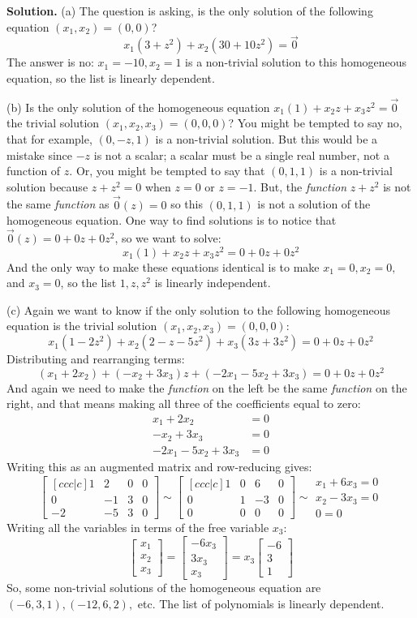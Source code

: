 \documentclass[11pt, letterpaper]{report}
\newenvironment{book}{}{}
\newcounter{example}[section]
\newcommand{\bbbvec}[3]{
  \begin{bmatrix} #1 \\ #2 \\ #3 \end{bmatrix}
}
\begin{document}
\begin{book}
\textbf{Solution.} (a) The question is asking, is the only solution of the following equation $(x_1,x_2) = (0,0)$?
\[x_1(3+z^2) + x_2(30+10z^2) = \vec{0}\]
The answer is no: $x_1=-10,x_2=1$ is a non-trivial solution to this homogeneous equation, so the list is linearly dependent.

(b) Is the only solution of the homogeneous equation $x_1(1) + x_2z + x_3z^2 = \vec{0}$ the trivial solution $(x_1,x_2,x_3) = (0,0,0)$? You might be tempted to say no, that for example, $(0,-z,1)$ is a non-trivial solution. But this would be a mistake since $-z$ is not a scalar; a scalar must be a single real number, not a function of $z$. Or, you might be tempted to say that $(0,1,1)$ is a non-trivial solution because $z+z^2=0$ when $z=0$ or $z=-1$. But, the \emph{function} $z+z^2$ is not the same \emph{function} as $\vec{0}(z)=0$ so this $(0,1,1)$ is not a solution of the homogeneous equation.
One way to find solutions is to notice that $\vec{0}(z)= 0+0z+0z^{2}$, so we want to solve:
\[x_1(1)+x_2z+x_3z^2=0+0z+0z^2\]
And the only way to make these equations identical is to make $x_1=0,x_2=0,$ and $x_3=0$, so the list $1,z,z^2$ is linearly independent.

(c) Again we want to know if the only solution to the following homogeneous equation is the trivial solution $(x_1,x_2,x_3)=(0,0,0)$:
\[x_1(1-2z^2) + x_2(2-z-5z^2) + x_3(3z+3z^2) = 0 + 0z + 0z^2\]
Distributing and rearranging terms:
\[(x_1+2x_2) + (-x_2+3x_3)z + (-2x_1-5x_2+3x_3)=0 + 0z + 0z^2\]
And again we need to make the \emph{function} on the left be the same \emph{function} on the right, and that means making all three of the coefficients equal to zero:
\begin{align*}
x_1+2x_2 &= 0 \\
-x_2+3x_3&=0 \\
-2x_1-5x_2+3x_3&=0
\end{align*}
Writing this as an augmented matrix and row-reducing gives:
\[\begin{bmatrix}[ccc|c]
1 & 2 & 0 & 0 \\
0 & -1 & 3 & 0 \\
-2 & -5 & 3 & 0
\end{bmatrix} \sim \begin{bmatrix}[ccc|c]
1 & 0 & 6 & 0 \\
0 & 1 & -3 & 0\\
0 & 0 & 0 & 0
\end{bmatrix} \sim
\begin{matrix}
x_1+6x_3 = 0 \\
x_2-3x_3 = 0 \\
0 = 0
\end{matrix}
\]
Writing all the variables in terms of the free variable $x_3$:
\[\bbbvec{x_1}{x_2}{x_3} = \bbbvec{-6x_3}{3x_3}{x_3} = x_3 \bbbvec{-6}{3}{1}\]
So, some non-trivial solutions of the homogeneous equation are $(-6,3,1),(-12,6,2),$ etc. The list of polynomials is linearly dependent.
\blacksquare
\end{book}
\end{document}
